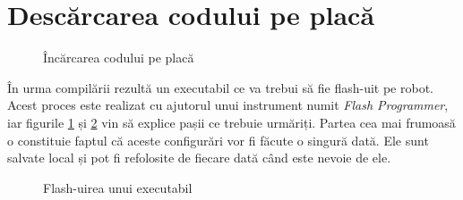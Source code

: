 \section{Descărcarea codului pe placă}

\begin{figure}
    \vspace{-25pt}
    \vspace{-20pt}
    \caption{\label{fig:CodeWarrior-FlashProgrammer1} Încărcarea codului pe placă}
    \vspace{-20pt}
\end{figure}

În urma compilării rezultă un executabil ce va trebui să fie flash-uit pe robot. Acest proces este realizat cu ajutorul unui instrument numit \textit{Flash Programmer}, iar figurile \ref{fig:CodeWarrior-FlashProgrammer1} și \ref{fig:CodeWarrior-FlashProgrammer2} vin să explice pașii ce trebuie urmăriți. Partea cea mai frumoasă o constituie faptul că aceste configurări vor fi făcute o singură dată. Ele sunt salvate local și pot fi refolosite de fiecare dată când este nevoie de ele.

\begin{figure}
    \vspace{-70pt}
    \vspace{-20pt}
    \caption{\label{fig:CodeWarrior-FlashProgrammer2} Flash-uirea unui executabil}
    \vspace{-20pt}
\end{figure}

